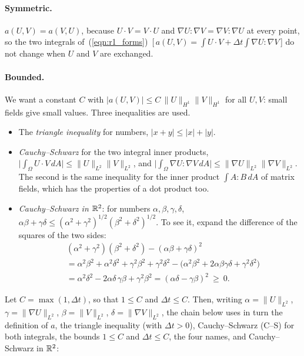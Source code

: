 \paragraph{Symmetric.} $a(U, V) = a(V, U)$, because $U\cdot V = V\cdot U$ and $\nabla U : \nabla V = \nabla V : \nabla U$ at every point, so the two integrals of~(\ref{eqn:r1_forms})~[\,$a(U, V) = \int U\cdot V + \Delta t\int \nabla U:\nabla V$\,] do not change when $U$ and $V$ are exchanged.

\paragraph{Bounded.} We want a constant $C$ with $|a(U, V)| \leq C\, \|U\|_{H^1} \|V\|_{H^1}$ for all $U, V$: small fields give small values. Three inequalities are used.
\begin{itemize}
\item The \emph{triangle inequality} for numbers, $|x + y| \le |x| + |y|$.
\item \emph{Cauchy--Schwarz} for the two integral inner products, $\big|\int_\Omega U\cdot V\, dA\big| \leq \|U\|_{L^2}\|V\|_{L^2}$, and $\big|\int_\Omega \nabla U : \nabla V\, dA\big| \leq \|\nabla U\|_{L^2}\|\nabla V\|_{L^2}$. The second is the same inequality for the inner product $\int A : B\, dA$ of matrix fields, which has the properties of a dot product too.
\item \emph{Cauchy--Schwarz in $\mathbb{R}^2$}: for numbers $\alpha, \beta, \gamma, \delta$, $\alpha\beta + \gamma\delta \le (\alpha^2 + \gamma^2)^{1/2} (\beta^2 + \delta^2)^{1/2}$. To see it, expand the difference of the squares of the two sides:
\begin{align*}
&(\alpha^2 + \gamma^2)(\beta^2 + \delta^2) - (\alpha\beta + \gamma\delta)^2 \\
&= \alpha^2\beta^2 + \alpha^2\delta^2 + \gamma^2\beta^2 + \gamma^2\delta^2 - \big(\alpha^2\beta^2 + 2\alpha\beta\gamma\delta + \gamma^2\delta^2\big) \\
&= \alpha^2\delta^2 - 2\alpha\delta\,\gamma\beta + \gamma^2\beta^2 = (\alpha\delta - \gamma\beta)^2 \ \ge\ 0 .
\end{align*}
\end{itemize}
Let $C = \max(1, \Delta t)$, so that $1 \le C$ and $\Delta t \le C$. Then, writing $\alpha = \|U\|_{L^2}$, $\gamma = \|\nabla U\|_{L^2}$, $\beta = \|V\|_{L^2}$, $\delta = \|\nabla V\|_{L^2}$, the chain below uses in turn the definition of $a$, the triangle inequality (with $\Delta t > 0$), Cauchy--Schwarz (C--S) for both integrals, the bounds $1 \le C$ and $\Delta t \le C$, the four names, and Cauchy--Schwarz in $\mathbb{R}^2$:

